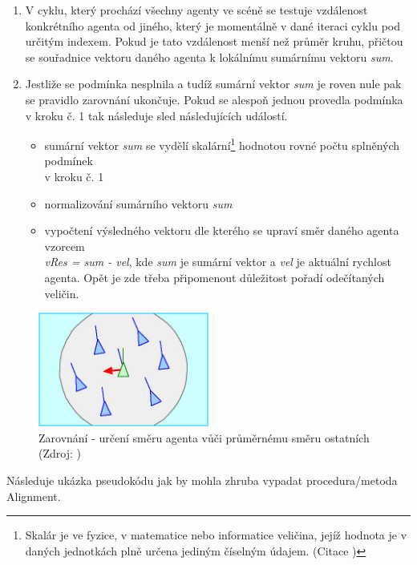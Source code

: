 \documentclass[czech,public,dept460,male,cpdeclaration]{diploma}
\begin{document}
\begin{enumerate}
	\item V cyklu, který prochází všechny agenty ve scéně se testuje vzdálenost konkrétního agenta od jiného, který je momentálně v dané iteraci cyklu pod určitým indexem. Pokud je tato vzdálenost menší než průměr kruhu, přičtou se souřadnice vektoru daného agenta k lokálnímu sumárnímu vektoru \textit{sum}.
	\item Jestliže se podmínka nesplnila a tudíž sumární vektor \textit{sum} je roven nule pak se pravidlo zarovnání ukončuje. Pokud se alespoň jednou provedla podmínka v kroku č. 1 tak následuje sled následujících událostí.
	
	\begin{itemize}
		\item sumární vektor \textit{sum} se vydělí skalární\footnote{Skalár je ve fyzice, v matematice nebo informatice veličina, jejíž hodnota je v daných jednotkách plně určena jediným číselným údajem. (Citace \cite{linkToScalar})} hodnotou rovné počtu splněných podmínek \\v kroku č. 1
		\item normalizování sumárního vektoru \textit{sum}
		\item vypočtení výsledného vektoru dle kterého se upraví směr daného agenta vzorcem \\\textit{vRes = sum - vel}, kde \textit{sum} je sumární vektor a \textit{vel} je aktuální rychlost agenta. Opět je zde třeba připomenout důležitost pořadí odečítaných veličin.
	\end{itemize}
	
\end{enumerate}

\begin{figure}[H]\centering\includegraphics[width=0.5\textwidth]{Figures/alignment.jpg}
	\caption{Zarovnání - určení směru agenta vůči průměrnému směru ostatních (Zdroj: \cite{link2})}
\end{figure}

Následuje ukázka pseudokódu jak by mohla zhruba vypadat procedura/metoda Alignment.
\end{document}
